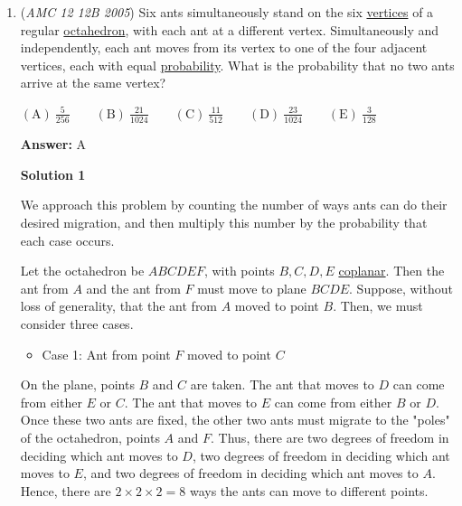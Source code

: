 \begin{enumerate}
 Using $\tan(BOJ) = 2$, and the tangent addition formula, this simplifies to $\dfrac{3}{11}$, so the answer is $3 + 11 = \boxed{\mathrm{(A)}\ 14}$



	\item (\textit{AMC 12 12B 2005}) Six ants simultaneously stand on the six \href{https://artofproblemsolving.com/wiki/index.php?title=Vertex}{vertices} of a regular \href{https://artofproblemsolving.com/wiki/index.php?title=Octahedron}{octahedron}, with each ant at a different vertex. Simultaneously and independently, each ant moves from its vertex to one of the four adjacent vertices, each with equal \href{https://artofproblemsolving.com/wiki/index.php?title=Probability}{probability}. What is the probability that no two ants arrive at the same vertex?


 $\mathrm{(A)}\ \frac {5}{256} \qquad\mathrm{(B)}\ \frac {21}{1024} \qquad\mathrm{(C)}\ \frac {11}{512} \qquad\mathrm{(D)}\ \frac {23}{1024} \qquad\mathrm{(E)}\ \frac {3}{128}$

 \textbf{Answer: }A



\textbf{Solution 1}

We approach this problem by counting the number of ways ants can do their desired migration, and then multiply this number by the probability that each case occurs.

 Let the octahedron be $ABCDEF$, with points $B,C,D,E$ \href{https://artofproblemsolving.com/wiki/index.php?title=Coplanar}{coplanar}. Then the ant from $A$ and the ant from $F$ must move to plane $BCDE$. Suppose, without loss of generality, that the ant from $A$ moved to point $B$. Then, we must consider three cases.

 
            \begin{itemize}
        \item Case 1: Ant from point $F$ moved to point $C$
            \end{itemize}
            On the plane, points $B$ and $C$ are taken. The ant that moves to $D$ can come from either $E$ or $C$. The ant that moves to $E$ can come from either $B$ or $D$. Once these two ants are fixed, the other two ants must migrate to the "poles" of the octahedron, points $A$ and $F$. Thus, there are two degrees of freedom in deciding which ant moves to $D$, two degrees of freedom in deciding which ant moves to $E$, and two degrees of freedom in deciding which ant moves to $A$. Hence, there are $2 \times 2 \times 2=8$ ways the ants can move to different points.


\end{enumerate}
